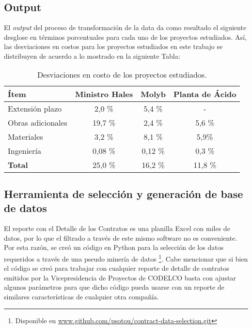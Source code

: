 \subsection{Output}

El \emph{output} del proceso de transformación de la data da como resultado el siguiente desglose en términos porcentuales para cada uno de los proyectos estudiados. Así, las desviaciones en costos para los proyectos estudiados en este trabajo se distribuyen de acuerdo a lo mostrado en la siguiente Tabla:

\begin{table}[H]
    \centering
    \label{tab.datos_desv_proy}
    \caption{Desviaciones en costo de los proyectos estudiados.}
    \begin{tabular}{lccc}
        \toprule 
        Ítem              & Ministro Hales      & Molyb   & Planta de Ácido \\
        \midrule
        Extensión plazo   & 2,0 \%  & 5,4 \%  & -       \\
        Obras adicionales & 19,7 \% & 2,4 \%  & 5,6 \%  \\
        Materiales        & 3,2 \%  & 8,1 \%  & 5,9\%   \\       
        Ingeniería        & 0,08 \% & 0,12 \% & 0,3 \%  \\
        \textbf{Total}    & 25,0 \% & 16,2 \% & 11,8 \% \\
        \bottomrule
    \end{tabular}
\end{table}

\subsection{Herramienta de selección y generación de base de datos}

El reporte con el Detalle de los Contratos es una planilla Excel con miles de datos, por lo que el filtrado a través de este mismo software no es conveniente. Por esta razón, se creó un código en Python para la selección de los datos requeridos a través de una pseudo minería de datos \footnote{Disponible en \url{www.github.com/psotou/contract-data-selection.git} }. Cabe mencionar que si bien el código se creó para trabajar con cualquier reporte de detalle de contratos emitidos por la Vicepresidencia de Proyectos de CODELCO basta con ajustar algunos parámetros para que dicho código pueda usarse con un reporte de similares características de cualquier otra compañía.

